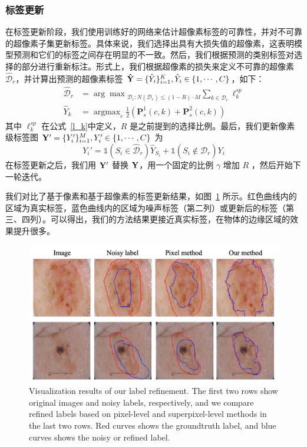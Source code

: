 \subsubsection{标签更新}

在标签更新阶段，我们使用训练好的网络来估计超像素标签的可靠性，并对不可靠的超像素子集更新标签。具体来说，我们选择出具有大损失值的超像素，这表明模型预测和它们的标签之间存在明显的不一致。然后，我们根据预测的类别标签对选择的部分进行重新标注。形式上，我们根据超像素的损失来定义不可靠的超像素 $\mathcal{\hat{D}}_r$，并计算出预测的超像素标签 $\mathbf{\hat{Y}} =\{\hat{Y}_i\}_{i=1}^K,\hat{Y}_i\in \{1,\cdots,C\}$，如下：
\begin{align}
    {\mathcal{\hat{D}}}_r &= {\arg\max}_{{\mathcal{D}_r}: N({\mathcal{D}_r})\le (1-{R})\cdot M} \sum_{k\in{\mathcal{D}_r}}\ell_k^{sp} \\
    \hat{Y}_k &= \mathop{\arg\max}_{c}\frac{1}{2}(\mathbf{P}_s^1(c,k) + \mathbf{P}_s^2(c,k))
\end{align}
其中 $\ell_k^{sp}$ 在公式~\ref{l_k}中定义，$R$ 是之前提到的选择比例。最后，我们更新像素级标签图 $\mathbf{Y}'=\{Y'_i\}_{i=1}^M, Y'_i\in\{1,\cdots, C\}$ 为
\begin{equation}
	Y_i' = \mathds{1}(S_i \in {\mathcal{\hat{D}}}_r )\hat{Y}_{S_i} + \mathds{1}(S_i \notin {\mathcal{\hat{D}}}_r )Y_i
\end{equation}
在标签更新之后，我们用 $\mathbf{Y}'$ 替换 $\mathbf{Y}$，用一个固定的比例 $\gamma$ 增加 $R$ ，然后开始下一轮迭代。

我们对比了基于像素和基于超像素的标签更新结果，如图~\ref{fig:vis_correct} 所示。红色曲线内的区域为真实标签，蓝色曲线内的区域为噪声标签（第二列）或更新后的标签（第三、四列）。可以得出，我们的方法结果更接近真实标签，在物体的边缘区域的效果提升很多。
    \begin{figure}[tbp]
        \centering 
        \includegraphics[width=1.0\textwidth]{img/c4/f43m.png}
        {Visualization results of our label refinement. The first two rows show original images and noisy labels, respectively, and we compare refined labels based on pixel-level and superpixel-level methods in the last two rows. Red curves shows the groundtruth label, and blue curves shows the noisy or refined label.}
        \label{fig:vis_correct}
    \end{figure}

